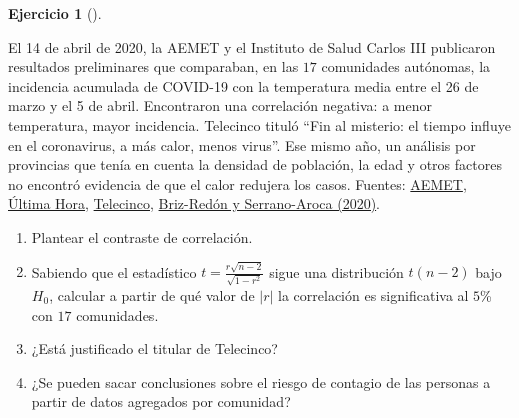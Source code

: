 \documentclass[
  spanish,
  a4paper,
]{scrreport}
\theoremstyle{definition}
\newtheorem{exercise}{Ejercicio}[chapter]
\theoremstyle{remark}
\begin{document}
\begin{exercise}[]\protect\hypertarget{exr-interpretacion-calor-virus}{}\label{exr-interpretacion-calor-virus}

El 14 de abril de 2020, la AEMET y el Instituto de Salud Carlos III
publicaron resultados preliminares que comparaban, en las \(17\)
comunidades autónomas, la incidencia acumulada de COVID-19 con la
temperatura media entre el 26 de marzo y el 5 de abril. Encontraron una
correlación negativa: a menor temperatura, mayor incidencia. Telecinco
tituló ``Fin al misterio: el tiempo influye en el coronavirus, a más
calor, menos virus''. Ese mismo año, un análisis por provincias que
tenía en cuenta la densidad de población, la edad y otros factores no
encontró evidencia de que el calor redujera los casos. Fuentes:
\href{https://aemetblog.es/2020/04/14/primeros-indicios-de-correlacion-entre-variables-meteorologicas-y-propagacion-de-la-enfermedad-covid19-y-del-virus-sars-cov-2-en-espana/}{AEMET},
\href{https://www.ultimahora.es/noticias/nacional/2020/04/14/1157019/coronavirus-espana-menos-temperatura-mayor-incidencia-covid-19.html}{Última
Hora},
\href{https://telecinco.es/noticias/ciencia-y-tecnologia/temperaturas-contagios-coronavirus_18_2930820286.html}{Telecinco},
\href{https://expeditiorepositorio.utadeo.edu.co/items/b359a00b-b4c2-4060-8a94-a983356058a6}{Briz-Redón
y Serrano-Aroca (2020)}.

\begin{enumerate}
\def\labelenumi{\alph{enumi}.}
\item
  Plantear el contraste de correlación.
\item
  Sabiendo que el estadístico \(t=\frac{r\sqrt{n-2}}{\sqrt{1-r^2}}\)
  sigue una distribución \(t(n-2)\) bajo \(H_0\), calcular a partir de
  qué valor de \(|r|\) la correlación es significativa al \(5\)\% con
  \(17\) comunidades.
\item
  ¿Está justificado el titular de Telecinco?
\item
  ¿Se pueden sacar conclusiones sobre el riesgo de contagio de las
  personas a partir de datos agregados por comunidad?
\end{enumerate}

\end{exercise}
\end{document}
